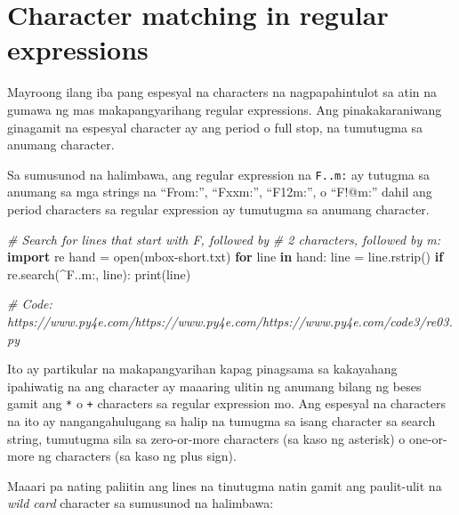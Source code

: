 \documentclass[10pt,]{book}
\newenvironment{Shaded}{}{}
\newcommand{\BuiltInTok}[1]{\textcolor[rgb]{0.00,0.50,0.00}{#1}}
\newcommand{\CommentTok}[1]{\textcolor[rgb]{0.38,0.63,0.69}{\textit{#1}}}
\newcommand{\ControlFlowTok}[1]{\textcolor[rgb]{0.00,0.44,0.13}{\textbf{#1}}}
\newcommand{\ImportTok}[1]{\textcolor[rgb]{0.00,0.50,0.00}{\textbf{#1}}}
\newcommand{\KeywordTok}[1]{\textcolor[rgb]{0.00,0.44,0.13}{\textbf{#1}}}
\newcommand{\NormalTok}[1]{#1}
\newcommand{\OperatorTok}[1]{\textcolor[rgb]{0.40,0.40,0.40}{#1}}
\newcommand{\StringTok}[1]{\textcolor[rgb]{0.25,0.44,0.63}{#1}}
\begin{document}

\section{Character matching in regular
expressions}\label{character-matching-in-regular-expressions}

Mayroong ilang iba pang espesyal na characters na nagpapahintulot sa
atin na gumawa ng mas makapangyarihang regular expressions. Ang
pinakakaraniwang ginagamit na espesyal character ay ang period o full
stop, na tumutugma sa anumang character.

 

Sa sumusunod na halimbawa, ang regular expression na \texttt{F..m:} ay
tutugma sa anumang sa mga strings na ``From:'', ``Fxxm:'', ``F12m:'', o
``F!@m:'' dahil ang period characters sa regular expression ay tumutugma
sa anumang character.

\begin{Shaded}
\begin{Highlighting}[]
\CommentTok{\# Search for lines that start with \textquotesingle{}F\textquotesingle{}, followed by}
\CommentTok{\# 2 characters, followed by \textquotesingle{}m:\textquotesingle{}}
\ImportTok{import}\NormalTok{ re}
\NormalTok{hand }\OperatorTok{=} \BuiltInTok{open}\NormalTok{(}\StringTok{\textquotesingle{}mbox{-}short.txt\textquotesingle{}}\NormalTok{)}
\ControlFlowTok{for}\NormalTok{ line }\KeywordTok{in}\NormalTok{ hand:}
\NormalTok{    line }\OperatorTok{=}\NormalTok{ line.rstrip()}
    \ControlFlowTok{if}\NormalTok{ re.search(}\StringTok{\textquotesingle{}\^{}F..m:\textquotesingle{}}\NormalTok{, line):}
        \BuiltInTok{print}\NormalTok{(line)}

\CommentTok{\# Code: https://www.py4e.com/https://www.py4e.com/https://www.py4e.com/code3/re03.py}
\end{Highlighting}
\end{Shaded}


Ito ay partikular na makapangyarihan kapag pinagsama sa kakayahang
ipahiwatig na ang character ay maaaring ulitin ng anumang bilang ng
beses gamit ang \texttt{*} o \texttt{+} characters sa regular expression
mo. Ang espesyal na characters na ito ay nangangahulugang sa halip na
tumugma sa isang character sa search string, tumutugma sila sa
zero-or-more characters (sa kaso ng asterisk) o one-or-more ng
characters (sa kaso ng plus sign).

Maaari pa nating paliitin ang lines na tinutugma natin gamit ang
paulit-ulit na \emph{wild card} character sa sumusunod na halimbawa:
\end{document}
